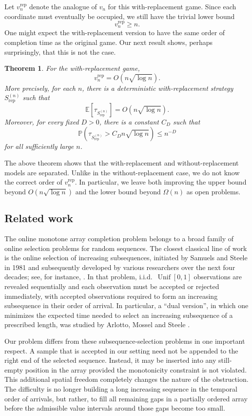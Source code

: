 \documentclass[11pt,reqno,letterpaper]{amsart}
\newtheorem{theorem}{Theorem}[section]
\theoremstyle{definition}
\numberwithin{equation}{section}
\newcommand{\E}{\mathbb{E}}
\renewcommand{\P}{\mathbb{P}}
\newcommand{\on}{\operatorname}
\begin{document}
Let \(v_n^{\mathrm{rep}}\) denote the analogue of \(v_n\) for this with-replacement
game.  Since each coordinate must eventually be occupied, we still have the trivial
lower bound
\[
v_n^{\mathrm{rep}}\ge n.
\]
One might expect the with-replacement version to have the same order of completion
time as the original game.  Our next result shows, perhaps surprisingly, that this is not the case.

\begin{theorem}\label{thm:replacement-upper}
For the with-replacement game,
\[
v_n^{\mathrm{rep}}=O(n\sqrt{\log n}).
\]
More precisely, for each \(n\), there is a deterministic with-replacement strategy
\(S_{\mathrm{rep}}^{(n)}\) such that
\[
\E[\tau_{S_{\mathrm{rep}}^{(n)}}]=O(n\sqrt{\log n}).
\]
Moreover, for every fixed \(D>0\), there is a constant \(C_D\) such that
\[
\P\left(\tau_{S_{\mathrm{rep}}^{(n)}}>C_D n\sqrt{\log n}\right)\le n^{-D}
\]
for all sufficiently large \(n\).
\end{theorem}

The above theorem shows that the with-replacement and without-replacement models are separated. Unlike in the without-replacement case, we do not know the correct order of $v_n^{\on{rep}}$. In particular, we leave both improving the upper bound beyond $O(n\sqrt {\log n})$ and the lower bound beyond $\Omega(n)$ as open problems. 

\subsection{Related work}
The online monotone array completion problem belongs to a broad family of online selection problems for random sequences. The closest classical line of work is the online selection of increasing subsequences, initiated by Samuels and Steele in 1981 \cite{SamuelsSteele81} and subsequently developed by various researchers over the next four decades; see, for instance, \cite{SamuelsSteele81,Gnedin99,BrussDelbaen01,BrussDelbaen04,ArlottoNguyenSteele15}.  In that problem, i.i.d.~$\on{Unif}[0,1]$ observations are revealed sequentially and each observation must be accepted or rejected immediately, with accepted observations required to form an increasing subsequence in their order of arrival. In particular, a ``dual version'', in which one minimizes the expected time needed to select an increasing subsequence of a prescribed length, was studied by Arlotto, Mossel and Steele \cite{ArlottoMosselSteele16}. 

Our problem differs from these subsequence-selection problems in one important respect.  A sample that is accepted in our setting need not be appended to the right end of the selected sequence.  Instead, it may be inserted into any still-empty position in the array provided the monotonicity constraint is not violated.  This additional spatial freedom completely changes the nature of the obstruction.  The difficulty is no longer building a long increasing sequence in the temporal order of arrivals, but rather, to fill all remaining gaps in a partially ordered array before the admissible value intervals around those gaps become too small.
\end{document}
